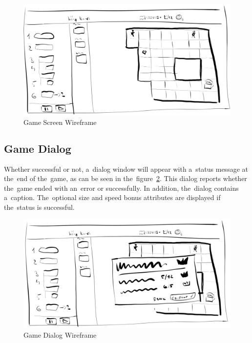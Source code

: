 \begin{figure}
    \centering
    \includegraphics[width=1\linewidth]{assets/design/ui/wir_game_mission.png}
    \caption{Game Screen Wireframe}
    \label{fig:design:wir:game-mission}
\end{figure}

\subsection{Game Dialog}

Whether successful or not, a~dialog window will appear with a~status message at the~end of the~game, as can be seen in the~figure~\ref{fig:design:wir:game-dialog}.
This dialog reports whether the~game ended with an~error or successfully.
In addition, the~dialog contains a~caption.
The~optional size and speed bonus attributes are displayed if the~status is successful.

\begin{figure}
    \centering
    \includegraphics[width=1\linewidth]{assets/design/ui/wir_game_dialog.png}
    \caption{Game Dialog Wireframe}
    \label{fig:design:wir:game-dialog}
\end{figure}

